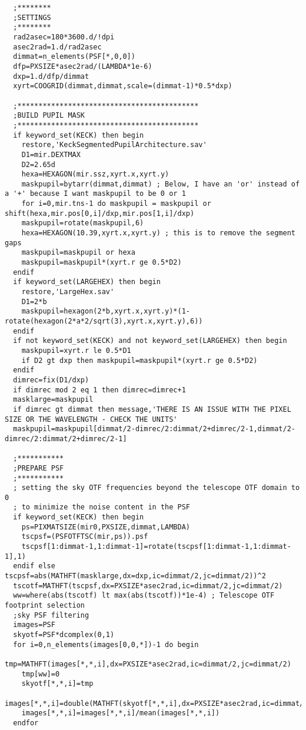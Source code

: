 \begin{lstlisting}
  ;********
  ;SETTINGS
  ;********
  rad2asec=180*3600.d/!dpi
  asec2rad=1.d/rad2asec
  dimmat=n_elements(PSF[*,0,0])
  dfp=PXSIZE*asec2rad/(LAMBDA*1e-6)
  dxp=1.d/dfp/dimmat
  xyrt=COOGRID(dimmat,dimmat,scale=(dimmat-1)*0.5*dxp)

  ;*******************************************
  ;BUILD PUPIL MASK
  ;*******************************************
  if keyword_set(KECK) then begin
    restore,'KeckSegmentedPupilArchitecture.sav'
    D1=mir.DEXTMAX
    D2=2.65d
    hexa=HEXAGON(mir.ssz,xyrt.x,xyrt.y)
    maskpupil=bytarr(dimmat,dimmat) ; Below, I have an 'or' instead of a '+' because I want maskpupil to be 0 or 1
    for i=0,mir.tns-1 do maskpupil = maskpupil or shift(hexa,mir.pos[0,i]/dxp,mir.pos[1,i]/dxp)
    maskpupil=rotate(maskpupil,6)
    hexa=HEXAGON(10.39,xyrt.x,xyrt.y) ; this is to remove the segment gaps
    maskpupil=maskpupil or hexa
    maskpupil=maskpupil*(xyrt.r ge 0.5*D2)
  endif
  if keyword_set(LARGEHEX) then begin
    restore,'LargeHex.sav'
    D1=2*b
    maskpupil=hexagon(2*b,xyrt.x,xyrt.y)*(1-rotate(hexagon(2*a*2/sqrt(3),xyrt.x,xyrt.y),6))
  endif
  if not keyword_set(KECK) and not keyword_set(LARGEHEX) then begin
    maskpupil=xyrt.r le 0.5*D1
    if D2 gt dxp then maskpupil=maskpupil*(xyrt.r ge 0.5*D2)
  endif
  dimrec=fix(D1/dxp)
  if dimrec mod 2 eq 1 then dimrec=dimrec+1
  masklarge=maskpupil
  if dimrec gt dimmat then message,'THERE IS AN ISSUE WITH THE PIXEL SIZE OR THE WAVELENGTH - CHECK THE UNITS'
  maskpupil=maskpupil[dimmat/2-dimrec/2:dimmat/2+dimrec/2-1,dimmat/2-dimrec/2:dimmat/2+dimrec/2-1]

  ;***********
  ;PREPARE PSF
  ;***********
  ; setting the sky OTF frequencies beyond the telescope OTF domain to 0
  ; to minimize the noise content in the PSF
  if keyword_set(KECK) then begin
    ps=PIXMATSIZE(mir0,PXSIZE,dimmat,LAMBDA)
    tscpsf=(PSFOTFTSC(mir,ps)).psf
    tscpsf[1:dimmat-1,1:dimmat-1]=rotate(tscpsf[1:dimmat-1,1:dimmat-1],1)
  endif else tscpsf=abs(MATHFT(masklarge,dx=dxp,ic=dimmat/2,jc=dimmat/2))^2
  tscotf=MATHFT(tscpsf,dx=PXSIZE*asec2rad,ic=dimmat/2,jc=dimmat/2)
  ww=where(abs(tscotf) lt max(abs(tscotf))*1e-4) ; Telescope OTF footprint selection
  ;sky PSF filtering
  images=PSF
  skyotf=PSF*dcomplex(0,1)
  for i=0,n_elements(images[0,0,*])-1 do begin
    tmp=MATHFT(images[*,*,i],dx=PXSIZE*asec2rad,ic=dimmat/2,jc=dimmat/2)
    tmp[ww]=0
    skyotf[*,*,i]=tmp
    images[*,*,i]=double(MATHFT(skyotf[*,*,i],dx=PXSIZE*asec2rad,ic=dimmat/2,jc=dimmat/2,/inverse))
    images[*,*,i]=images[*,*,i]/mean(images[*,*,i])
  endfor


\end{lstlisting}
